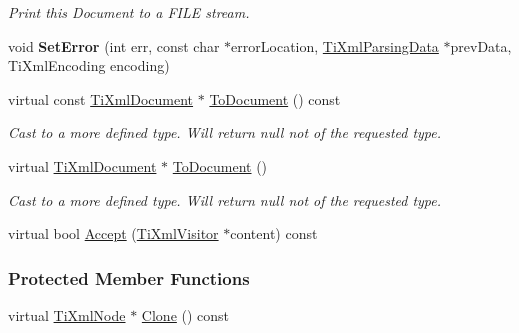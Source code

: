 \begin{DoxyCompactItemize}
\begin{DoxyCompactList}\small\item\em Print this Document to a FILE stream. \item\end{DoxyCompactList}\item 
\hypertarget{class_ti_xml_document_a735c23e318597b920c94eae77fa206de}{
void {\bfseries SetError} (int err, const char $\ast$errorLocation, \hyperlink{class_ti_xml_parsing_data}{TiXmlParsingData} $\ast$prevData, TiXmlEncoding encoding)}
\label{class_ti_xml_document_a735c23e318597b920c94eae77fa206de}

\item 
\hypertarget{class_ti_xml_document_a1dc977bde3e4fe85a8eb9d88a35ef5a4}{
virtual const \hyperlink{class_ti_xml_document}{TiXmlDocument} $\ast$ \hyperlink{class_ti_xml_document_a1dc977bde3e4fe85a8eb9d88a35ef5a4}{ToDocument} () const }
\label{class_ti_xml_document_a1dc977bde3e4fe85a8eb9d88a35ef5a4}

\begin{DoxyCompactList}\small\item\em Cast to a more defined type. Will return null not of the requested type. \item\end{DoxyCompactList}\item 
\hypertarget{class_ti_xml_document_a1025d942a1f328fd742d545e37efdd42}{
virtual \hyperlink{class_ti_xml_document}{TiXmlDocument} $\ast$ \hyperlink{class_ti_xml_document_a1025d942a1f328fd742d545e37efdd42}{ToDocument} ()}
\label{class_ti_xml_document_a1025d942a1f328fd742d545e37efdd42}

\begin{DoxyCompactList}\small\item\em Cast to a more defined type. Will return null not of the requested type. \item\end{DoxyCompactList}\item 
virtual bool \hyperlink{class_ti_xml_document_a3daab2f472418ef66315750202f762ae}{Accept} (\hyperlink{class_ti_xml_visitor}{TiXmlVisitor} $\ast$content) const 
\end{DoxyCompactItemize}
\subsubsection*{Protected Member Functions}
\begin{DoxyCompactItemize}
\item 
virtual \hyperlink{class_ti_xml_node}{TiXmlNode} $\ast$ \hyperlink{class_ti_xml_document_ac9e8f09b23454d953b32d1b65cd1409e}{Clone} () const 
\end{DoxyCompactItemize}


